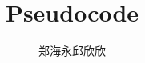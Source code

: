 \documentclass[12pt]{article}
\begin{document}
\title{\vspace{-2em}Pseudocode\vspace{-0.7em}}
\author{郑海永\;邱欣欣}
\maketitle\thispagestyle{fancy}
\end{document}
